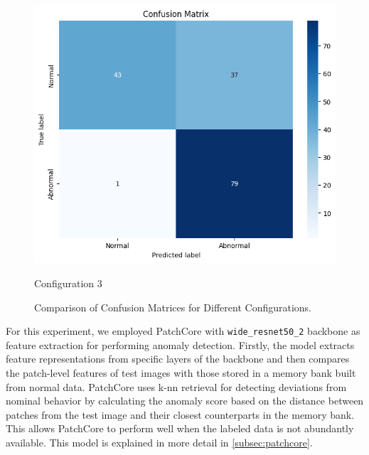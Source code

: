 \begin{figure}[ht!]
    \vspace{0.5cm} %
    
    \begin{minipage}{0.6\textwidth}
        \centering
        \includegraphics[width=\textwidth]{Rohit_Master_Thesis//Images/patchcore_config3_confusion_matrix.jpg} %
        \caption{Configuration 3}
    \end{minipage}
    
    \caption{Comparison of Confusion Matrices for Different Configurations.}
    \label{fig:dataset-NG}
\end{figure}
\fi

For this experiment, we employed PatchCore with \texttt{wide\_resnet50\_2} backbone as feature extraction for performing anomaly detection. Firstly, the model extracts feature representations from specific layers of the backbone and then compares the patch-level features of test images with those stored in a memory bank built from normal data. PatchCore uses \gls{k-nn} retrieval for detecting deviations from nominal behavior by calculating the anomaly score based on the distance between patches from the test image and their closest counterparts in the memory bank. This allows PatchCore to perform well when the labeled data is not abundantly available. This model is explained in more detail in \ref{subsec:patchcore}.

